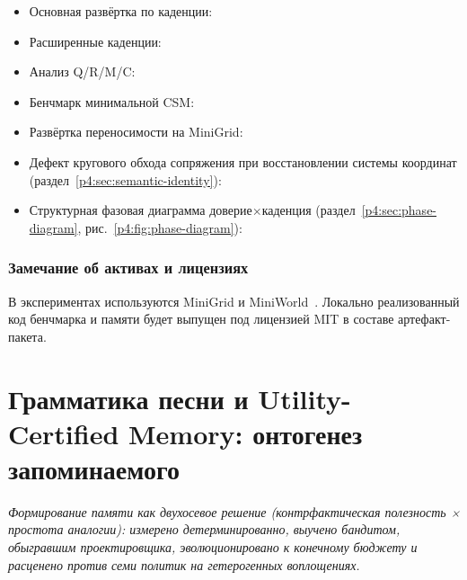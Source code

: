 \documentclass{article}
\begin{document}
\begin{itemize}[leftmargin=16pt]
\item Основная развёртка по каденции:
\item Расширенные каденции:
\item Анализ Q/R/M/C:
\item Бенчмарк минимальной CSM:
\item Развёртка переносимости на MiniGrid:
\item Дефект кругового обхода сопряжения при восстановлении системы координат (раздел~\ref{p4:sec:semantic-identity}):
\item Структурная фазовая диаграмма доверие$\times$каденция (раздел~\ref{p4:sec:phase-diagram}, рис.~\ref{p4:fig:phase-diagram}):
\end{itemize}

\section{Замечание об активах и лицензиях}
\label{p4:app:assets}

В экспериментах используются MiniGrid и MiniWorld~\citep{MinigridMiniworld23}. Локально реализованный код бенчмарка и памяти будет выпущен под лицензией MIT в составе артефакт-пакета.

\clearpage
\FloatBarrier
\FloatBarrier

\clearpage
\part{Грамматика песни и Utility-Certified Memory: онтогенез запоминаемого}
\noindent\textit{Формирование памяти как двухосевое решение (контрфактическая полезность × простота аналогии): измерено детерминированно, выучено бандитом, обыгравшим проектировщика, эволюционировано к конечному бюджету и расценено против семи политик на гетерогенных воплощениях.}
\end{document}
